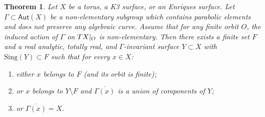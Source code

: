 \documentclass[JEP,XML,SOM,Unicode,published]{cedram}
\newenvironment{enumeratea}
{\bgroup\def\theenumi{\alph{enumi}}\begin{enumerate}}
{\end{enumerate}\egroup}
\newcommand{\rest}[1]{ \arrowvert_{#1}}
\newcommand{\Sing}{{\mathrm{Sing}}}
\newcommand\Aut{\mathsf{Aut}}
\theoremstyle{plain}
\newtheorem{thm}{Theorem}[section]
\theoremstyle{definition}
\begin{document}
\begin{thm}\label{thm:orbit_closures}
Let $X$ be a torus, a K3 surface, or an Enriques surface.
Let $\Gamma\subset \Aut(X)$ be a non-elementary subgroup which contains parabolic elements and does not
preserve any algebraic curve. Assume
that for any finite orbit $O$, the induced action of $\Gamma$ on $TX\rest{O}$ is non-elementary.
Then there exists a finite set $F$ and a real analytic,
totally real, and $\Gamma$-invariant surface $Y \subset X$ with $\Sing(Y)\subset F$
such that for every $x\in X$:
\begin{enumeratea}
\item\label{thm:orbit_closuresa} either $x$ belongs to $F$ (and its orbit is finite);
\item\label{thm:orbit_closuresb} or $x$ belongs to $Y\setminus F$ and $\overline{ \Gamma (x)}$ is a union of components of $Y$;
\item\label{thm:orbit_closuresc} or $\overline{ \Gamma (x)} =X$.
\end{enumeratea}
\end{thm}
\end{document}
